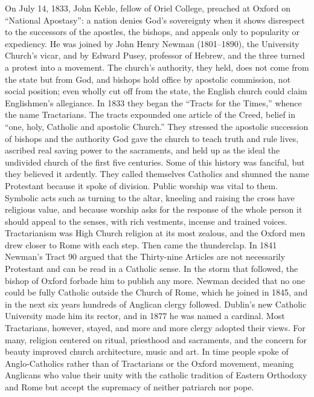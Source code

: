 On July 14, 1833, John Keble, fellow of Oriel College, preached at Oxford on ``National Apostasy'': a
nation denies God's sovereignty when it shows disrespect to the successors of the apostles, the
bishops, and appeals only to popularity or expediency. He was joined by John Henry Newman
(1801--1890), the University Church's vicar, and by Edward Pusey, professor of Hebrew, and the three
turned a protest into a movement. The church's authority, they held, does not come from the state but
from God, and bishops hold office by apostolic commission, not social position; even wholly cut off from the state, the English church could claim Englishmen's allegiance. In 1833 they began the
``Tracts for the Times,'' whence the name Tractarians. The tracts expounded one article of the Creed,
belief in ``one, holy, Catholic and apostolic Church.'' They stressed the apostolic succession of
bishops and the authority God gave the church to teach truth and rule lives, ascribed real saving
power to the sacraments, and held up as the ideal the undivided church of the first five centuries.
Some of this history was fanciful, but they believed it ardently. They called themselves Catholics
and shunned the name Protestant because it spoke of division. Public worship was vital to them.
Symbolic acts such as turning to the altar, kneeling and raising the cross have religious value, and
because worship asks for the response of the whole person it should appeal to the senses, with rich
vestments, incense and trained voices. Tractarianism was High Church religion at its most zealous, and the Oxford men drew closer to Rome with each step. Then came the thunderclap. In 1841 Newman's Tract 90
argued that the Thirty-nine Articles are not necessarily Protestant and can be read in a Catholic
sense. In the storm that followed, the bishop of Oxford forbade him to publish any more. Newman decided that no one could be fully Catholic outside the Church of Rome, which he joined in 1845, and in the next six years hundreds of Anglican clergy followed. Dublin's new Catholic University made him its rector, and in 1877 he was named a cardinal. Most Tractarians, however, stayed, and more and
more clergy adopted their views. For many, religion centered on ritual, priesthood and sacraments,
and the concern for beauty improved church architecture, music and art. In time people spoke of Anglo-Catholics rather than of Tractarians or the Oxford movement, meaning Anglicans who value their unity with the catholic
tradition of Eastern Orthodoxy and Rome but accept the supremacy of neither patriarch nor pope.

